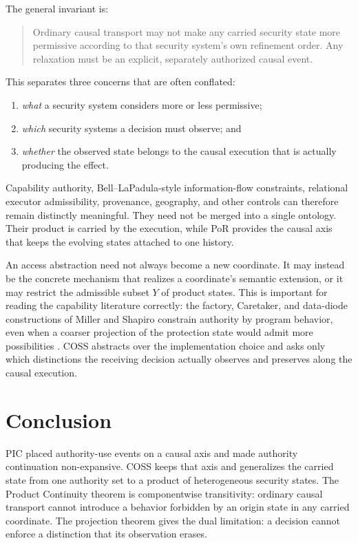 \documentclass[10pt,twocolumn]{article}
\newcommand{\Model}{\textnormal{\textsc{COSS}}\xspace}
\begin{document}
The general invariant is:
\begin{quote}
Ordinary causal transport may not make any carried security state more
permissive according to that security system's own refinement order.  Any
relaxation must be an explicit, separately authorized causal event.
\end{quote}

This separates three concerns that are often conflated:
\begin{enumerate}[leftmargin=*]
  \item \emph{what} a security system considers more or less permissive;
  \item \emph{which} security systems a decision must observe; and
  \item \emph{whether} the observed state belongs to the causal execution that
        is actually producing the effect.
\end{enumerate}

Capability authority, Bell--LaPadula-style information-flow constraints,
relational executor admissibility, provenance, geography, and other controls
can therefore remain distinctly meaningful.  They need not be merged into a
single ontology.  Their product is carried by the execution, while PoR provides
the causal axis that keeps the evolving states attached to one history.

An access abstraction need not always become a new coordinate.  It may instead
be the concrete mechanism that realizes a coordinate's semantic extension, or
it may restrict the admissible subset $Y$ of product states.  This is important
for reading the capability literature correctly: the factory, Caretaker, and
data-diode constructions of Miller and Shapiro constrain authority by program
behavior, even when a coarser projection of the protection state would admit
more possibilities \cite{miller_shapiro2003}.  \Model abstracts over the
implementation choice and asks only which distinctions the receiving decision
actually observes and preserves along the causal execution.

\section{Conclusion}

PIC placed authority-use events on a causal axis and made authority continuation
non-expansive. \Model keeps that axis and generalizes the carried state from one
authority set to a product of heterogeneous security states. The Product
Continuity theorem is componentwise transitivity: ordinary causal transport
cannot introduce a behavior forbidden by an origin state in any carried
coordinate. The projection theorem gives the dual limitation: a decision
cannot enforce a distinction that its observation erases.
\end{document}
